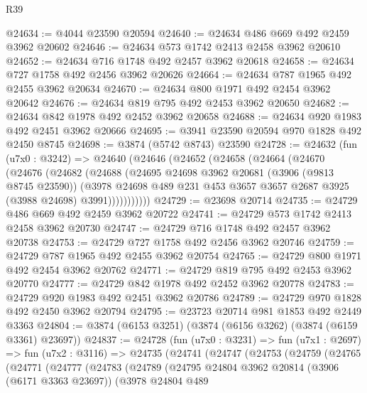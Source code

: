 \begin{lexlean}{R39}
\begin{coremodule}
@24634 := @4044 @23590 @20594
@24640 := @24634 @486 @669 @492 @2459 @3962 @20602
@24646 := @24634 @573 @1742 @2413 @2458 @3962 @20610
@24652 := @24634 @716 @1748 @492 @2457 @3962 @20618
@24658 := @24634 @727 @1758 @492 @2456 @3962 @20626
@24664 := @24634 @787 @1965 @492 @2455 @3962 @20634
@24670 := @24634 @800 @1971 @492 @2454 @3962 @20642
@24676 := @24634 @819 @795 @492 @2453 @3962 @20650
@24682 := @24634 @842 @1978 @492 @2452 @3962 @20658
@24688 := @24634 @920 @1983 @492 @2451 @3962 @20666
@24695 := @3941 @23590 @20594 @970 @1828 @492 @2450 @8745
@24698 := @3874 (@5742 @8743) @23590
@24728 := @24632
    (fun (u7x0 : @3242) =>
    @24640
      (@24646
        (@24652
          (@24658
            (@24664
              (@24670
                (@24676
                  (@24682
                    (@24688
                      (@24695
                        @24698
                        @3962
                        @20681
                        (@3906 (@9813 @8745 @23590))
                        (@3978
                          @24698
                          @489
                          @231
                          @453
                          @3657
                          @3657
                          @2687
                          @3925
                          (@3988 @24698)
                          @3991)))))))))))
@24729 := @23698 @20714
@24735 := @24729 @486 @669 @492 @2459 @3962 @20722
@24741 := @24729 @573 @1742 @2413 @2458 @3962 @20730
@24747 := @24729 @716 @1748 @492 @2457 @3962 @20738
@24753 := @24729 @727 @1758 @492 @2456 @3962 @20746
@24759 := @24729 @787 @1965 @492 @2455 @3962 @20754
@24765 := @24729 @800 @1971 @492 @2454 @3962 @20762
@24771 := @24729 @819 @795 @492 @2453 @3962 @20770
@24777 := @24729 @842 @1978 @492 @2452 @3962 @20778
@24783 := @24729 @920 @1983 @492 @2451 @3962 @20786
@24789 := @24729 @970 @1828 @492 @2450 @3962 @20794
@24795 := @23723 @20714 @981 @1853 @492 @2449 @3363
@24804 := @3874 (@6153 @3251) (@3874 (@6156 @3262) (@3874 (@6159 @3361) @23697))
@24837 := @24728
    (fun (u7x0 : @3231) =>
    fun (u7x1 : @2697) =>
    fun (u7x2 : @3116) =>
    @24735
      (@24741
        (@24747
          (@24753
            (@24759
              (@24765
                (@24771
                  (@24777
                    (@24783
                      (@24789
                        (@24795
                          @24804
                          @3962
                          @20814
                          (@3906 (@6171 @3363 @23697))
                          (@3978
                            @24804
                            @489

\end{coremodule}
\end{lexlean}
